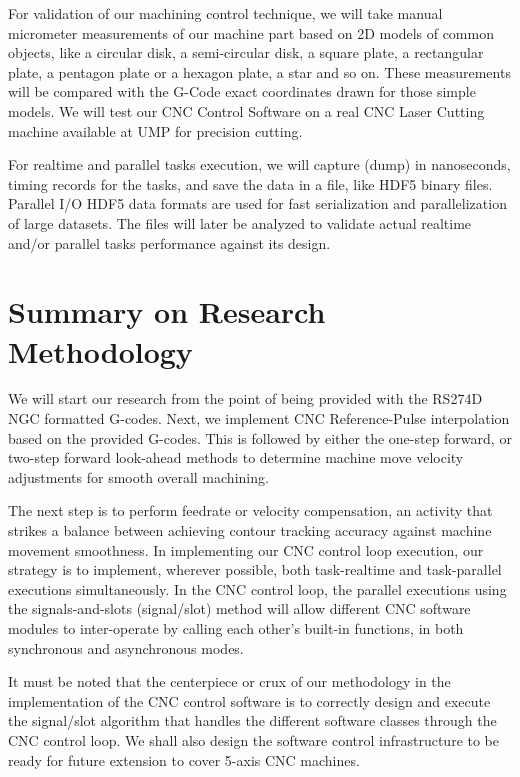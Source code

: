 For validation of our machining control technique, we will take manual micrometer measurements of our machine part based on 2D models of common objects, like a circular disk, a semi-circular disk, a square plate, a rectangular plate, a pentagon plate or a hexagon plate, a star and so on. These measurements will be compared with the G-Code exact coordinates drawn for those simple models. We will test our CNC Control Software on a real CNC Laser Cutting machine available at UMP for precision cutting.
\vspace{0.5cm}

For realtime and parallel tasks execution, we will capture (dump) in nanoseconds, timing records for the tasks, and save the data in a file, like HDF5 binary files. Parallel I/O HDF5 data formats are used for fast serialization and parallelization of large datasets. The files will later be analyzed to validate actual realtime and/or parallel tasks performance against its design.

\pagebreak
\section{Summary on Research Methodology}

We will start our research from the point of being provided with the RS274D NGC formatted G-codes. Next, we implement CNC Reference-Pulse interpolation based on the provided G-codes. This is followed by either the one-step forward, or two-step forward look-ahead methods to determine machine move velocity adjustments for smooth overall machining.
\vspace{0.5cm}

The next step is to perform feedrate or velocity compensation, an activity that strikes a balance between achieving contour tracking accuracy against machine movement smoothness. In implementing our CNC control loop execution, our strategy is to implement, wherever possible, both task-realtime and task-parallel executions simultaneously. In the CNC control loop, the parallel executions using the signals-and-slots (signal/slot) method will allow different CNC software modules to inter-operate by calling each other's built-in functions, in both synchronous and asynchronous modes.
\vspace{0.5cm}

It must be noted that the centerpiece or crux of our methodology in the implementation of the CNC control software is to correctly design and execute the signal/slot algorithm that handles the different software classes through the CNC control loop. We shall also design the software control infrastructure to be ready for future extension to cover 5-axis CNC machines.
\vspace{0.5cm}

